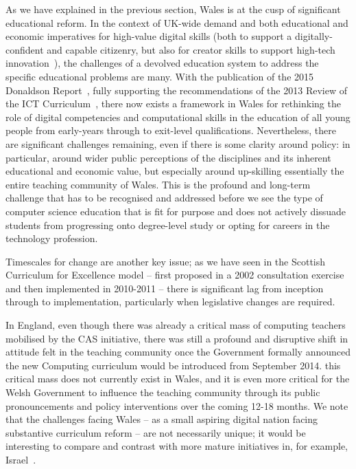 As we have explained in the previous section, Wales is at the cusp of
significant educational reform. In the context of UK-wide demand and
both educational and economic imperatives for high-value digital
skills (both to support a digitally-confident and capable citizenry,
but also for creator skills to support high-tech
innovation~\cite{ukdigskillstf:2014,ukholdigskills:2015}), the
challenges of a devolved education system to address the specific
educational problems are many. With the publication of the 2015
Donaldson Report~\cite{Donaldson:2015}, fully supporting the
recommendations of the 2013 Review of the ICT
Curriculum~\cite{welshictreview:2013}, there now exists a framework in
Wales for rethinking the role of digital competencies and
computational skills in the education of all young people from
early-years through to exit-level qualifications. Nevertheless, there
are significant challenges remaining, even if there is some clarity
around policy: in particular, around wider public perceptions of the
disciplines and its inherent educational and economic value, but
especially around up-skilling essentially the entire teaching
community of Wales. This is the profound and long-term challenge that
has to be recognised and addressed before we see the type of computer
science education that is fit for purpose and does not actively
dissuade students from progressing onto degree-level study or opting
for careers in the technology profession.

Timescales for change are another key issue; as we have seen in the
Scottish Curriculum for Excellence model -- first proposed in a 2002
consultation exercise and then implemented in 2010-2011 -- there is
significant lag from inception through to implementation, particularly
when legislative changes are required.

In England, even though there was already a critical mass of computing
teachers mobilised by the CAS initiative, there was still a profound
and disruptive shift in attitude felt in the teaching community once
the Government formally announced the new Computing curriculum would
be introduced from September 2014.  this critical mass does not
currently exist in Wales, and it is even more critical for the Welsh
Government to influence the teaching community through its public
pronouncements and policy interventions over the coming 12-18
months. We note that the challenges facing Wales -- as a small
aspiring digital nation facing substantive curriculum reform -- are
not necessarily unique; it would be interesting to compare and
contrast with more mature initiatives in, for example,
Israel~\cite{armonia+gal-ezerb:2014}.


